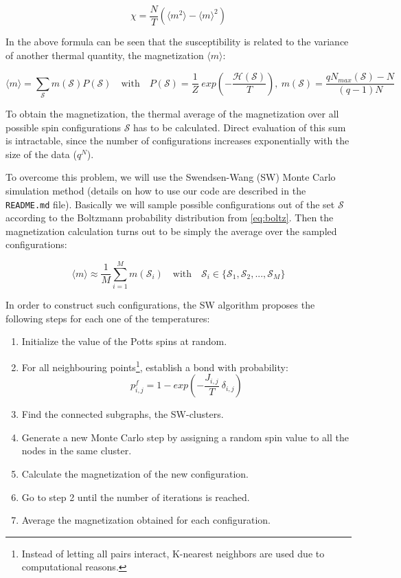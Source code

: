 \documentclass{article} %
\begin{document}
\begin{equation}
\chi=\frac{N}{T}(\langle m^2 \rangle - \langle m \rangle^2)
\end{equation}

In the above formula can be seen that the susceptibility is related to the variance of another thermal quantity, the magnetization $\langle m \rangle$:

\begin{equation} \label{eq:boltz}
\langle m \rangle = \sum_{\mathcal{S}}m(\mathcal{S})P(\mathcal{S})\quad \text{with}\quad P(\mathcal{S})=\frac{1}{Z}\ exp(-\frac{\mathcal{H}(\mathcal{S})}{T}),\ m(\mathcal{S})=\frac{qN_{max}(\mathcal{S})-N}{(q-1)N}
\end{equation}

To obtain the magnetization, the thermal average of the magnetization over all possible spin configurations $\mathcal{S}$ has to be calculated. Direct evaluation of this sum is intractable, since the number of configurations increases exponentially with the size of the data ($q^N$).

To overcome this problem, we will use the Swendsen-Wang (SW) Monte Carlo simulation method (details on how to use our code are described in the \texttt{README.md} file). Basically we will sample possible configurations out of the set $\mathcal{S}$ according to the Boltzmann probability distribution from \eqref{eq:boltz}. Then the magnetization calculation turns out to be simply the average over the sampled configurations:

\begin{equation}
\langle m \rangle \approx \frac{1}{M} \sum_{i=1}^{M} m(\mathcal{S}_{i}) \quad \text{with} \quad \mathcal{S}_i \in \{\mathcal{S}_1, \mathcal{S}_2, ...,\mathcal{S}_M \}
\end{equation}

In order to construct such configurations, the SW algorithm proposes the following steps for each one of the temperatures:
\begin{enumerate}
\item Initialize the value of the Potts spins at random.
\item For all neighbouring points\footnote{Instead of letting all pairs interact, K-nearest neighbors are used due to computational reasons.}, establish a bond with probability:
\begin{equation}
p_{i,j}^{f}=1 - exp(-\frac{J_{i,j}}{T}\ \delta_{i,j})
\end{equation}
\item Find the connected subgraphs, the SW-clusters.
\item Generate a new Monte Carlo step by assigning a random spin value to all the nodes in the same cluster.
\item Calculate the magnetization of the new configuration.
\item Go to step 2 until the number of iterations is reached.
\item Average the magnetization obtained for each configuration.
\end{enumerate}
\end{document}
